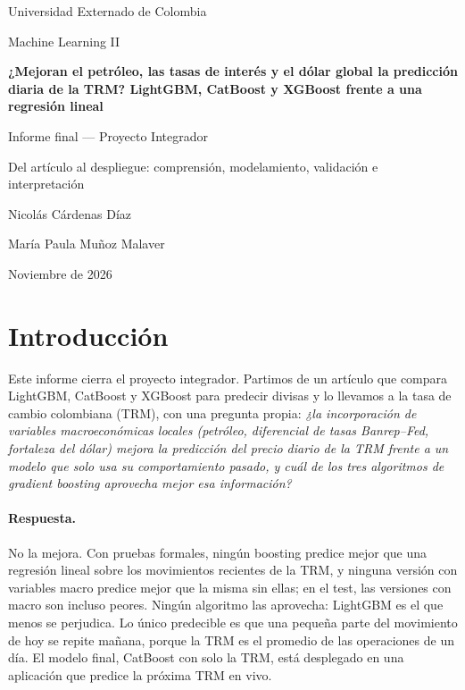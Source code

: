 \documentclass[11pt,letterpaper]{article}
\newcommand{\tituloproyecto}{¿Mejoran el petróleo, las tasas de interés y el dólar global la predicción diaria de la TRM? LightGBM, CatBoost y XGBoost frente a una regresión lineal}
\newcommand{\integranteuno}{Nicolás Cárdenas Díaz}
\newcommand{\integrantedos}{María Paula Muñoz Malaver}
\begin{document}
\begin{titlepage}
\centering
\vspace*{1.5cm}
{\large Universidad Externado de Colombia\par}
{\large Machine Learning II\par}
\vspace{2.5cm}
{\Large \textbf{\tituloproyecto}\par}
\vspace{1cm}
{\large Informe final --- Proyecto Integrador\par}
{\large Del artículo al despliegue: comprensión, modelamiento, validación e interpretación\par}
\vspace{2.5cm}
{\large \integranteuno \par}
{\large \integrantedos \par}
\vfill
{\large Noviembre de 2026\par}
\end{titlepage}

\section*{Introducción}

Este informe cierra el proyecto integrador. Partimos de un artículo que compara LightGBM, CatBoost y XGBoost para predecir divisas \cite{articulo} y lo llevamos a la tasa de cambio colombiana (TRM), con una pregunta propia: \emph{¿la incorporación de variables macroeconómicas locales (petróleo, diferencial de tasas Banrep--Fed, fortaleza del dólar) mejora la predicción del precio diario de la TRM frente a un modelo que solo usa su comportamiento pasado, y cuál de los tres algoritmos de gradient boosting aprovecha mejor esa información?}

\paragraph{Respuesta.} No la mejora. Con pruebas formales, ningún boosting predice mejor que una regresión lineal sobre los movimientos recientes de la TRM, y ninguna versión con variables macro predice mejor que la misma sin ellas; en el test, las versiones con macro son incluso peores. Ningún algoritmo las aprovecha: LightGBM es el que menos se perjudica. Lo único predecible es que una pequeña parte del movimiento de hoy se repite mañana, porque la TRM es el promedio de las operaciones de un día. El modelo final, CatBoost con solo la TRM, está desplegado en una aplicación que predice la próxima TRM en vivo.
\end{document}
